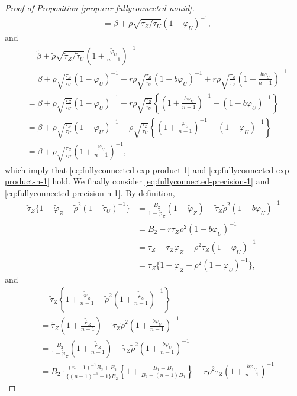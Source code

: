 \documentclass[11pt]{article}
\theoremstyle{definition}
\theoremstyle{remark}
\begin{document}
\begin{proof}[Proof of Proposition \ref{prop:car-fullyconnected-nonid}]
\begin{align*}
&= \beta + \rho\sqrt{\tau_Z/\tau_U}(1-\varphi_U)^{-1},
\end{align*} 
and 
\begin{align*}
& \quad \ \tilde\beta + \tilde\rho\sqrt{\tilde\tau_Z/\tilde\tau_U}\left(1+\frac{\tilde\varphi_U}{n-1}\right)^{-1} 
\\
&= \beta + \rho\sqrt{\frac{\tau_Z}{\tau_U}}(1-\varphi_U)^{-1} - r\rho\sqrt{\frac{\tau_Z}{\tau_U}}(1-b\varphi_U)^{-1} + r\rho\sqrt{\frac{\tau_Z}{\tau_U}}\left(1+ \frac{b\varphi_U}{n-1} \right)^{-1} \\
&= \beta + \rho\sqrt{\frac{\tau_Z}{\tau_U}}(1-\varphi_U)^{-1} + r\rho \sqrt{\frac{\tau_Z}{\tau_U}}\left\{\left(1+ \frac{b\varphi_U}{n-1} \right)^{-1}-(1-b\varphi_U)^{-1} \right\} \\
&= \beta + \rho\sqrt{\frac{\tau_Z}{\tau_U}}(1-\varphi_U)^{-1} + \rho\sqrt{\frac{\tau_Z}{\tau_U}}\left\{\left(1+ \frac{\varphi_U}{n-1} \right)^{-1}-(1-\varphi_U)^{-1}\right\}\\
&= \beta +\rho\sqrt{\frac{\tau_Z}{\tau_U}}\left(1+ \frac{\varphi_U}{n-1} \right)^{-1},
\end{align*} 
which imply that \eqref{eq:fullyconnected-exp-product-1} and \eqref{eq:fullyconnected-exp-product-n-1} hold. 
We finally consider \eqref{eq:fullyconnected-precision-1}
and \eqref{eq:fullyconnected-precision-n-1}. 
By definition, 
\begin{align*}
\tilde\tau_Z\{1-\tilde\varphi_Z - \tilde\rho^2(1-\tilde\tau_U)^{-1}\} &= \frac{B_2}{1-\tilde\varphi_Z}(1-\tilde\varphi_Z) - \tilde\tau_Z\tilde\rho^2(1-b\varphi_U)^{-1}
\\ &= B_2 - r \tau_Z \rho^2 (1-b\varphi_U)^{-1} \\
&= \tau_Z - \tau_Z \varphi_Z - \rho^2\tau_Z(1-\varphi_U)^{-1} 
\\ &= \tau_Z \{ 1 - \varphi_Z - \rho^2(1-\varphi_U)^{-1} \}, 
\end{align*} 
and 
\begin{align*}
& \quad \ \tilde\tau_Z\left\{1+ \frac{\tilde\varphi_Z}{n-1} - \tilde\rho^2 \left( 1+ \frac{\tilde\varphi_U}{n-1}\right)^{-1}\right\} 
\\
&= \tilde\tau_Z\left(1+\frac{\tilde\varphi_Z}{n-1} \right) - \tilde\tau_Z\tilde\rho^2\left(1+\frac{b\varphi_U}{n-1}\right)^{-1} 
\\ &= 
\frac{B_2}{1 -\tilde\varphi_Z }\left(1+\frac{\tilde\varphi_Z}{n-1} \right) - \tilde\tau_Z\tilde\rho^2\left(1+\frac{b\varphi_U}{n-1}\right)^{-1}
\\
&= 
B_2 \cdot \frac{(n-1)^{-1}B_2+B_1}{\{(n-1)^{-1} + 1\}B_2}\left\{ 1+\frac{B_1-B_2}{B_2 + (n-1)B_1}\right\} - r\rho^2\tau_Z\left(1+\frac{b\varphi_U}{n-1}\right)^{-1}

\end{align*}
\end{proof}
\end{document}
